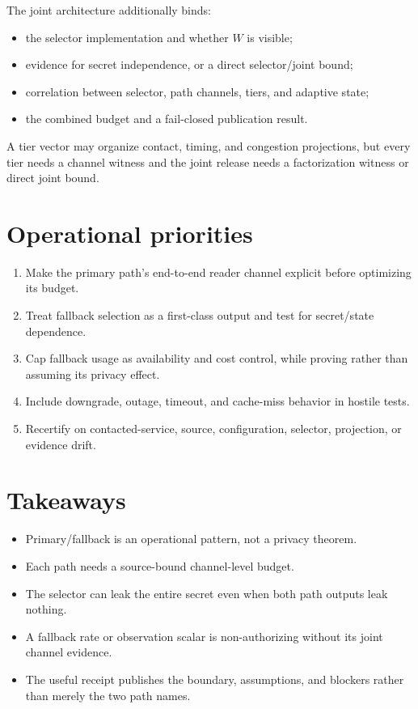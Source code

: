 \documentclass[11pt]{article}
\begin{document}
The joint architecture additionally binds:
\begin{itemize}[leftmargin=*]
\item the selector implementation and whether \(W\) is visible;
\item evidence for secret independence, or a direct selector/joint bound;
\item correlation between selector, path channels, tiers, and adaptive state;
\item the combined budget and a fail-closed publication result.
\end{itemize}

A tier vector may organize contact, timing, and congestion projections, but every tier needs a channel witness and the joint release needs a factorization witness or direct joint bound.\cite{series:tieredobs}

\section{Operational priorities}\label{sec:priorities}
\begin{enumerate}[leftmargin=*]
\item Make the primary path's end-to-end reader channel explicit before optimizing its budget.
\item Treat fallback selection as a first-class output and test for secret/state dependence.
\item Cap fallback usage as availability and cost control, while proving rather than assuming its privacy effect.
\item Include downgrade, outage, timeout, and cache-miss behavior in hostile tests.
\item Recertify on contacted-service, source, configuration, selector, projection, or evidence drift.\cite{series:recert}
\end{enumerate}

\section{Takeaways}
\begin{itemize}[leftmargin=*]
\item Primary/fallback is an operational pattern, not a privacy theorem.
\item Each path needs a source-bound channel-level budget.
\item The selector can leak the entire secret even when both path outputs leak nothing.
\item A fallback rate or observation scalar is non-authorizing without its joint channel evidence.
\item The useful receipt publishes the boundary, assumptions, and blockers rather than merely the two path names.
\end{itemize}
\end{document}
